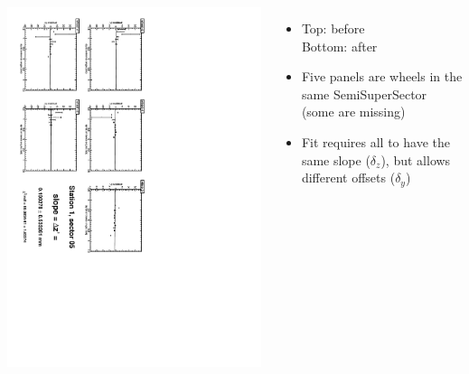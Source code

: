 \documentclass[compress]{beamer}
\begin{document}
\begin{frame}
\begin{columns}
\vfill
\includegraphics[height=\linewidth, angle=90]{zfits_after/zfit_1_05.pdf}
\begin{itemize}
\item Top: before \\ Bottom: after
\item Five panels are wheels in the same SemiSuperSector (some are missing)
\item Fit requires all to have the same slope ($\delta_z$), but allows different offsets ($\delta_y$)
\end{itemize}
\end{columns}
\end{frame}
\end{document}
